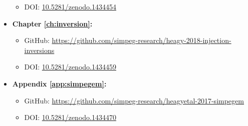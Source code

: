 \begin{itemize}
{\begin{itemize}
{                GitHub: \href{https://github.com/simpeg-research/heagy-2018-em-casing}{https://github.com/simpeg-research/heagy-2018-em-casing}
            }
            \item{
                DOI: \href{https://doi.org/10.5281/zenodo.1434454}{10.5281/zenodo.1434454}
            }
        \end{itemize}
    }
    \item{\textbf{Chapter \ref{ch:inversion}:}
        \begin{itemize}
            \item{
                GitHub: \href{https://github.com/simpeg-research/heagy-2018-injection-inversions}{https://github.com/simpeg-research/heagy-2018-injection-inversions}
            }
            \item{
                DOI: \href{https://doi.org/10.5281/zenodo.1434459}{10.5281/zenodo.1434459}
            }
        \end{itemize}
    }
    \item{\textbf{Appendix \ref{app:simpegem}:}
        \begin{itemize}
            \item{
                GitHub: \href{https://github.com/simpeg-research/heagyetal-2017-simpegem}{https://github.com/simpeg-research/heagyetal-2017-simpegem}
            }
            \item{
                DOI: \href{https://doi.org/10.5281/zenodo.1434470}{10.5281/zenodo.1434470}
            }
        \end{itemize}
    }


\end{itemize}


